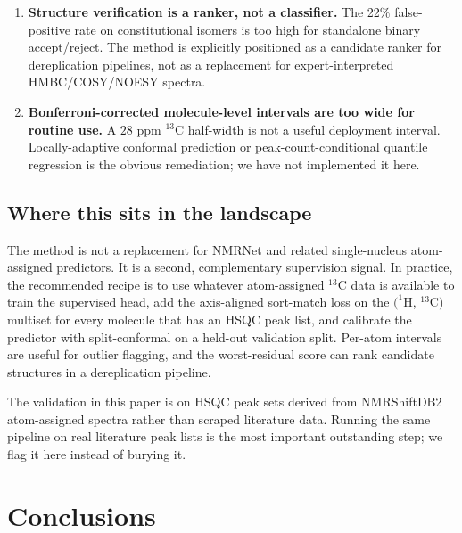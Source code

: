 \documentclass[
  11pt,
  a4paper,
]{article}
\begin{document}
\begin{enumerate}
  straightforward and left to future work.
\item
  \textbf{Structure verification is a ranker, not a classifier.} The
  22\(\%\) false-positive rate on constitutional isomers is too high for
  standalone binary accept/reject. The method is explicitly positioned
  as a candidate ranker for dereplication pipelines, not as a
  replacement for expert-interpreted HMBC/COSY/NOESY spectra.
\item
  \textbf{Bonferroni-corrected molecule-level intervals are too wide for
  routine use.} A \(28\) ppm \(^{13}\)C half-width is not a useful
  deployment interval. Locally-adaptive conformal prediction or
  peak-count-conditional quantile regression is the obvious
  remediation; we have not implemented it here.
\end{enumerate}

\subsection*{Where this sits in the landscape}

The method is not a replacement for NMRNet and related single-nucleus
atom-assigned predictors. It is a second, complementary supervision
signal. In practice, the recommended recipe is to use whatever
atom-assigned \(^{13}\)C data is available to train the supervised head,
add the axis-aligned sort-match loss on the \((^{1}\)H, \(^{13}\)C\()\)
multiset for every molecule that has an HSQC peak list, and calibrate
the predictor with split-conformal on a held-out validation split.
Per-atom intervals are useful for outlier flagging, and the
worst-residual score can rank candidate structures in a dereplication
pipeline.

The validation in this paper is on HSQC peak sets derived from
NMRShiftDB2 atom-assigned spectra rather than scraped literature data.
Running the same pipeline on real literature peak lists is the most
important outstanding step; we flag it here instead of burying it.

\section{Conclusions}\label{conclusions}
\end{document}
